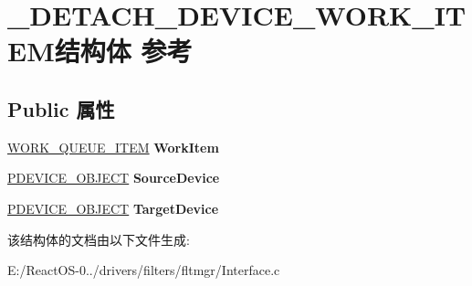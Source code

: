 \hypertarget{struct___d_e_t_a_c_h___d_e_v_i_c_e___w_o_r_k___i_t_e_m}{}\section{\+\_\+\+D\+E\+T\+A\+C\+H\+\_\+\+D\+E\+V\+I\+C\+E\+\_\+\+W\+O\+R\+K\+\_\+\+I\+T\+E\+M结构体 参考}
\label{struct___d_e_t_a_c_h___d_e_v_i_c_e___w_o_r_k___i_t_e_m}
\subsection*{Public 属性}
\begin{DoxyCompactItemize}
\item 
\mbox{\label{struct___d_e_t_a_c_h___d_e_v_i_c_e___w_o_r_k___i_t_e_m_aec991da537596d9ee11ddf649dc88c11}} 
\hyperlink{struct___w_o_r_k___q_u_e_u_e___i_t_e_m}{W\+O\+R\+K\+\_\+\+Q\+U\+E\+U\+E\+\_\+\+I\+T\+EM} {\bfseries Work\+Item}
\item 
\mbox{\label{struct___d_e_t_a_c_h___d_e_v_i_c_e___w_o_r_k___i_t_e_m_a0fdcb7046e55417e2984a816fa59f8c3}} 
\hyperlink{struct___d_e_v_i_c_e___o_b_j_e_c_t}{P\+D\+E\+V\+I\+C\+E\+\_\+\+O\+B\+J\+E\+CT} {\bfseries Source\+Device}
\item 
\mbox{\label{struct___d_e_t_a_c_h___d_e_v_i_c_e___w_o_r_k___i_t_e_m_a1476e99c269427ec5822be961ce1d020}} 
\hyperlink{struct___d_e_v_i_c_e___o_b_j_e_c_t}{P\+D\+E\+V\+I\+C\+E\+\_\+\+O\+B\+J\+E\+CT} {\bfseries Target\+Device}
\end{DoxyCompactItemize}


该结构体的文档由以下文件生成\+:\begin{DoxyCompactItemize}
\item 
E\+:/\+React\+O\+S-\/0../drivers/filters/fltmgr/Interface.\+c\end{DoxyCompactItemize}
